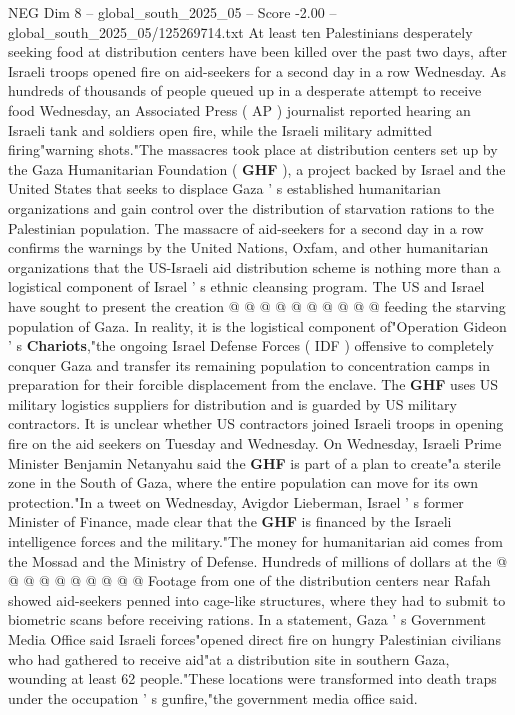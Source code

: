 \begin{textsample}{NEG Dim 8 – global\_south\_2025\_05 – Score -2.00 – global\_south\_2025\_05/125269714.txt}  \label{ex:f8_neg_004}
At least ten Palestinians desperately seeking food at distribution centers have been killed over the past two days, after Israeli troops opened fire on aid-seekers for a second day in a row Wednesday.
As hundreds of thousands of people queued up in a desperate attempt to receive food Wednesday, an Associated Press ( AP ) journalist reported hearing an Israeli tank and soldiers open fire, while the Israeli military admitted firing"warning shots."The massacres took place at distribution centers set up by the Gaza Humanitarian Foundation ( \textbf{GHF} ), a project backed by Israel and the United States that seeks to displace Gaza ' s established humanitarian organizations and gain control over the distribution of starvation rations to the Palestinian population.
The massacre of aid-seekers for a second day in a row confirms the warnings by the United Nations, Oxfam, and other humanitarian organizations that the US-Israeli aid distribution scheme is nothing more than a logistical component of Israel ' s ethnic cleansing program.
The US and Israel have sought to present the creation @ @ @ @ @ @ @ @ @ @ feeding the starving population of Gaza.
In reality, it is the logistical component of"Operation Gideon ' s \textbf{Chariots},"the ongoing Israel Defense Forces ( IDF ) offensive to completely conquer Gaza and transfer its remaining population to concentration camps in preparation for their forcible displacement from the enclave.
The \textbf{GHF} uses US military logistics suppliers for distribution and is guarded by US military contractors.
It is unclear whether US contractors joined Israeli troops in opening fire on the aid seekers on Tuesday and Wednesday.
On Wednesday, Israeli Prime Minister Benjamin Netanyahu said the \textbf{GHF} is part of a plan to create"a sterile zone in the South of Gaza, where the entire population can move for its own protection."In a tweet on Wednesday, Avigdor Lieberman, Israel ' s former Minister of Finance, made clear that the \textbf{GHF} is financed by the Israeli intelligence forces and the military."The money for humanitarian aid comes from the Mossad and the Ministry of Defense.
Hundreds of millions of dollars at the @ @ @ @ @ @ @ @ @ @ Footage from one of the distribution centers near Rafah showed aid-seekers penned into cage-like structures, where they had to submit to biometric scans before receiving rations.
In a statement, Gaza ' s Government Media Office said Israeli forces"opened direct fire on hungry Palestinian civilians who had gathered to receive aid"at a distribution site in southern Gaza, wounding at least 62 people."These locations were transformed into death traps under the occupation ' s gunfire,"the government media office said.

\end{textsample}
